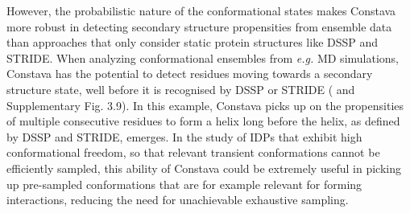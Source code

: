 


However, the probabilistic nature of the conformational states makes Constava more robust in detecting secondary structure propensities from ensemble data than approaches that only consider static protein structures like  DSSP and STRIDE. When analyzing conformational ensembles from \textit{e.g.} MD simulations, Constava has the potential to detect residues moving towards a secondary structure state, well before it is recognised by DSSP or STRIDE ( and Supplementary Fig. 3.9).
In this example, Constava picks up on the propensities of multiple consecutive residues to form a helix long before the helix, as defined by DSSP and STRIDE, emerges. In the study of IDPs that exhibit high conformational freedom, so that relevant transient conformations cannot be efficiently sampled, this ability of Constava could be extremely useful in picking up pre-sampled conformations that are for example relevant for forming interactions, reducing the need for unachievable exhaustive sampling.

